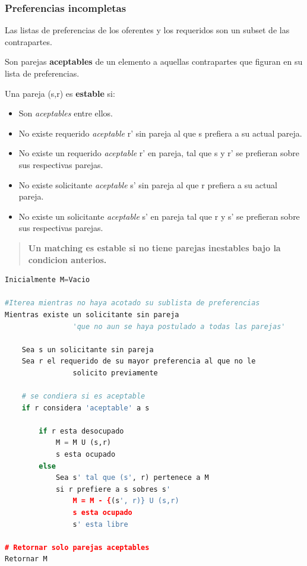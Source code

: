 \documentclass{article}
\begin{document}
\newpage
\subsubsection{Preferencias incompletas}
Las listas de preferencias de los oferentes y los requeridos son un subset de las contrapartes.

Son parejas \textbf{aceptables} de un elemento a aquellas contrapartes que figuran en su lista de preferencias.

Una pareja (s,r) es \textbf{estable} si:
\begin{itemize}
    \item Son \textit{aceptables} entre ellos.
    \item No existe requerido \textit{aceptable} r' sin pareja al que s prefiera a su actual pareja.
    \item No existe un requerido \textit{aceptable} r' en pareja, tal que s y r' se prefieran sobre sus respectivas parejas.
    \item No existe solicitante \textit{aceptable} s' sin pareja al que r prefiera a su actual pareja.
    \item No existe un solicitante \textit{aceptable} s' en pareja tal que r y s' se prefieran sobre sus respectivas parejas.
\end{itemize}

\begin{quote}
    \textbf{Un matching es estable si no tiene parejas inestables bajo la condicion anterios.}
\end{quote}

\begin{lstlisting}[language=Python, caption=Algoritmo para parejas incompletas]
Inicialmente M=Vacio

#Iterea mientras no haya acotado su sublista de preferencias
Mientras existe un solicitante sin pareja
                'que no aun se haya postulado a todas las parejas' 

    Sea s un solicitante sin pareja
    Sea r el requerido de su mayor preferencia al que no le
                solicito previamente
    
    # se condiera si es aceptable
    if r considera 'aceptable' a s

        if r esta desocupado
            M = M U (s,r)
            s esta ocupado
        else
            Sea s' tal que (s', r) pertenece a M
            si r prefiere a s sobres s'
                M = M - {(s', r)} U (s,r)
                s esta ocupado
                s' esta libre

# Retornar solo parejas aceptables
Retornar M

\end{lstlisting}    
\end{document}
